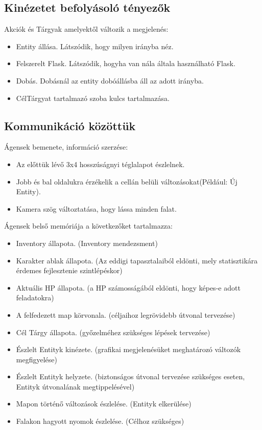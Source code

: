 \subsection{Kinézetet befolyásoló tényezők}

\noindent Akciók és Tárgyak amelyektől változik a megjelenés:

\begin{itemize}
    \item Entity állása. Látszódik, hogy milyen irányba néz.
    \item Felszerelt Flask. Látszódik, hogyha van nála általa használható Flask.
    \item Dobás. Dobásnál az entity dobóállásba áll az adott irányba.
    \item CélTárgyat tartalmazó szoba kulcs tartalmazása.
\end{itemize}

\subsection{Kommunikáció közöttük}

Ágensek bemenete, információ szerzése:
\begin{itemize}
    \item Az előttük lévő 3x4 hosszúságnyi téglalapot észlelnek.
    \item Jobb és bal oldalukra érzékelik a cellán belüli változásokat(Például: Új Entity).
    \item Kamera szög változtatása, hogy lássa minden falat.
\end{itemize}

\noindent Ágensek belső memóriája a következőket tartalmazza:
\begin{itemize}
    \item Inventory állapota. (Inventory mendezsment)
    \item Karakter ablak állapota. (Az eddigi tapasztalaiból eldönti, mely statisztikára érdemes fejlesztenie szintlépéskor)
    \item Aktuális HP állapota. (a HP számosságából eldönti, hogy képes-e adott feladatokra)
    \item A felfedezett map körvonala. (céljaihoz legrövidebb útvonal tervezése)
    \item Cél Tárgy állapota. (győzelméhez szükséges lépések tervezése)
    \item Észlelt Entityk kinézete. (grafikai megjelenésüket meghatározó változók megfigyelése)
    \item Észlelt Entityk helyzete. (biztonságos útvonal tervezése szükséges eseten, Entityk útvonalának megtippelésével)
    \item Mapon történő változások észlelése. (Entityk elkerülése)
    \item Falakon hagyott nyomok észlelése. (Célhoz szükséges)
\end{itemize}

